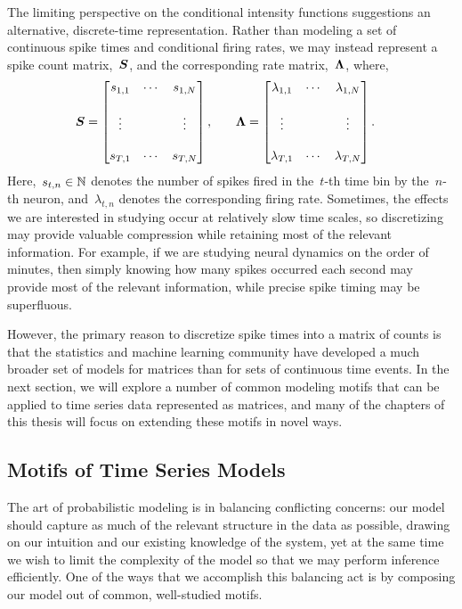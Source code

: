 The limiting perspective on the conditional intensity functions
suggestions an alternative, discrete-time representation.  Rather than
modeling a set of continuous spike times and conditional firing rates,
we may instead represent a spike count matrix,~$\boldsymbol{S}$, and the
corresponding rate matrix,~$\boldsymbol{\Lambda}$, where,
\begin{align}
  \boldsymbol{S} &= 
        \begin{bmatrix}
          s_{1,1} & \cdots & s_{1,N} \\
          & & \\
          \vdots  &        & \vdots  \\ 
          & & \\
          s_{T,1} & \cdots & s_{T,N}
        \end{bmatrix}, 
  & & &
  \boldsymbol{\Lambda} &= 
        \begin{bmatrix}
          \lambda_{1,1} & \cdots & \lambda_{1,N} \\
          & & \\
          \vdots  &        & \vdots  \\ 
          & & \\
          \lambda_{T,1} & \cdots & \lambda_{T,N}
        \end{bmatrix}.
\end{align}
Here,~$s_{t,n} \in \mathbb{N}$ denotes the number of spikes fired in
the~$t$-th time bin by the~$n$-th neuron, and~$\lambda_{t,n}$ denotes 
the corresponding firing rate. Sometimes, the effects we
are interested in studying occur at relatively slow time scales, so
discretizing may provide valuable compression while retaining most of
the relevant information. For example, if we are studying neural
dynamics on the order of minutes, then simply knowing how many spikes
occurred each second may provide most of the relevant information, while
precise spike timing may be superfluous.

However, the primary reason to discretize spike times into a matrix of
counts is that the statistics and machine learning community have
developed a much broader set of models for matrices than for sets of
continuous time events.  In the next section, we will explore a number
of common modeling motifs that can be applied to time series data
represented as matrices, and many of the chapters of this thesis will
focus on extending these motifs in novel ways.


\subsection{Motifs of Time Series Models}
\label{sec:motifs}
The art of probabilistic modeling is in balancing conflicting concerns:
our model should capture as much of the relevant structure in the data 
as possible, drawing on our intuition and our existing knowledge of the 
system, yet at the same time we wish to limit the complexity of the model
so that we may perform inference efficiently. One of the ways that we 
accomplish this balancing act is by composing our model out of common,
well-studied motifs. 

